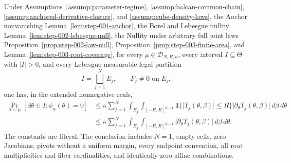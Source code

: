 \begin{proposition}
\label{prop:step-003-pivot-sweep}

Under Assumptions~\ref{assump:parameter-regime}, \ref{assump:balcan-common-chain},
\ref{assump:anchored-derivative-closure}, and \ref{assump:cube-density-laws}, the Anchor
nonvanishing Lemma~\ref{lem:step-001-anchor}, the Borel and Lebesgue nullity
Lemma~\ref{lem:step-002-lebesgue-null}, the Nullity under arbitrary full joint laws
Proposition~\ref{prop:step-002-law-null},
Proposition~\ref{prop:step-003-finite-area}, and
Lemma~\ref{lem:step-003-root-coverage}, for every
\(\mu\in\mathcal D_{N,R,\kappa}\), every interval \(I\subseteq\Theta\) with
\(\lvert I\rvert>0\), and every Lebesgue-measurable legal partition
\begin{equation}
\label{eq:appendix-display-097}
I=\bigsqcup_{j=1}^N E_j,\qquad F_j\neq0\text{ on }E_j,
\end{equation}
one has, in the extended nonnegative reals,
\begin{equation}
\label{eq:appendix-display-098}
\begin{aligned}
\Pr_{\alpha\sim\mu}
[\exists\theta\in I:\phi_\alpha(\theta)=0]
&\leq
\kappa\sum_{j=1}^N
\int_{E_j}\int_{[-R,R]^{N-1}}
\mathbf 1\{\lvert T_j(\theta,\beta)\rvert\leq R\}
\lvert\partial_\theta T_j(\theta,\beta)\rvert
\,d\beta\,d\theta\\
&\leq
\kappa\sum_{j=1}^N
\int_{E_j}\int_{[-R,R]^{N-1}}
\lvert\partial_\theta T_j(\theta,\beta)\rvert
\,d\beta\,d\theta.
\end{aligned}
\end{equation}
The constants are literal. The conclusion includes \(N=1\), empty cells, zero Jacobians, pivots without a
uniform margin, every endpoint convention, all root multiplicities and fiber cardinalities, and
identically-zero affine combinations.


\end{proposition}

